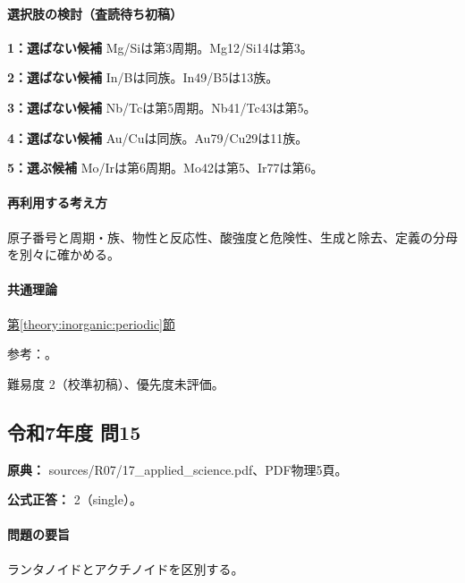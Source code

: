 \paragraph{選択肢の検討（査読待ち初稿）}\mbox{}\par

\noindent\textbf{1：選ばない候補} Mg/Siは第3周期。Mg12/Si14は第3。\par

\noindent\textbf{2：選ばない候補} In/Bは同族。In49/B5は13族。\par

\noindent\textbf{3：選ばない候補} Nb/Tcは第5周期。Nb41/Tc43は第5。\par

\noindent\textbf{4：選ばない候補} Au/Cuは同族。Au79/Cu29は11族。\par

\noindent\textbf{5：選ぶ候補} Mo/Irは第6周期。Mo42は第5、Ir77は第6。\par

\paragraph{再利用する考え方} 原子番号と周期・族、物性と反応性、酸強度と危険性、生成と除去、定義の分母を別々に確かめる。

\paragraph{共通理論} \hyperref[theory:inorganic:periodic]{第\ref*{theory:inorganic:periodic}節}

\par 参考：\cite{atomic_nist2019}。

\par 難易度 2（校準初稿）、優先度未評価。

\subsection{令和7年度 問15}
\label{q:r07-reg-applied-15}

\noindent\textbf{原典：} sources/R07/17\_applied\_science.pdf、PDF物理5頁。

\textbf{公式正答：} 2（single）。

\paragraph{問題の要旨} ランタノイドとアクチノイドを区別する。

